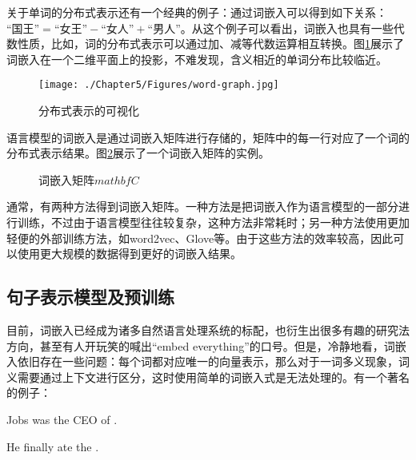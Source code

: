 \parinterval  关于单词的分布式表示还有一个经典的例子：通过词嵌入可以得到如下关系：$\textrm{``国王''}=\textrm{``女王''}-\textrm{``女人''} +\textrm{``男人''}$。从这个例子可以看出，词嵌入也具有一些代数性质，比如，词的分布式表示可以通过加、减等代数运算相互转换。图\ref{fig:5-66}展示了词嵌入在一个二维平面上的投影，不难发现，含义相近的单词分布比较临近。

\begin{figure}[htp]
\centering
\texttt{[image: ./Chapter5/Figures/word-graph.jpg]}
\caption{分布式表示的可视化}
\label{fig:5-66}
\end{figure}

\parinterval  语言模型的词嵌入是通过词嵌入矩阵进行存储的，矩阵中的每一行对应了一个词的分布式表示结果。图\ref{fig:5-67}展示了一个词嵌入矩阵的实例。

\begin{figure}[htp]
\centering

\caption{词嵌入矩阵$mathbf C$}
\label{fig:5-67}
\end{figure}

\parinterval  通常，有两种方法得到词嵌入矩阵。一种方法是把词嵌入作为语言模型的一部分进行训练，不过由于语言模型往往较复杂，这种方法非常耗时；另一种方法使用更加轻便的外部训练方法，如word2vec\cite{mikolov2013distributed}、Glove\cite{pennington2014glove}等。由于这些方法的效率较高，因此可以使用更大规模的数据得到更好的词嵌入结果。


\subsection{句子表示模型及预训练}

\parinterval  目前，词嵌入已经成为诸多自然语言处理系统的标配，也衍生出很多有趣的研究法方向，甚至有人开玩笑的喊出``embed everything''的口号。但是，冷静地看，词嵌入依旧存在一些问题：每个词都对应唯一的向量表示，那么对于一词多义现象，词义需要通过上下文进行区分，这时使用简单的词嵌入式是无法处理的。有一个著名的例子：

\begin{example}
Jobs was the CEO of {}.

\qquad \qquad \; He finally ate the {}.
\end{example}

